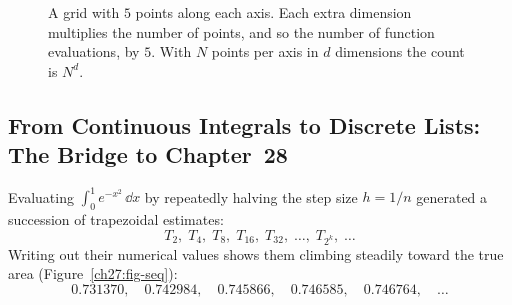 \begin{figure}[htbp]
\centering
{}
\caption{A grid with $5$ points along each axis. Each extra dimension multiplies the number of points, and so the number of function evaluations, by $5$. With $N$ points per axis in $d$ dimensions the count is $N^d$.}
\label{ch27:fig-grid}
\end{figure}

\subsection{From Continuous Integrals to Discrete Lists: The Bridge to Chapter~28}
\label{ch27:bridge}

Evaluating $\int_0^1 e^{-x^2}\,\dd x$ by repeatedly halving the step size $h = 1/n$
generated a succession of trapezoidal estimates:
\[
  T_2,\; T_4,\; T_8,\; T_{16},\; T_{32},\; \dots,\; T_{2^k},\; \dots
\]
Writing out their numerical values shows them climbing steadily toward the true area (Figure~\ref{ch27:fig-seq}):
\[
  0.731370,\quad 0.742984,\quad 0.745866,\quad 0.746585,\quad 0.746764,\quad \dots
\]

